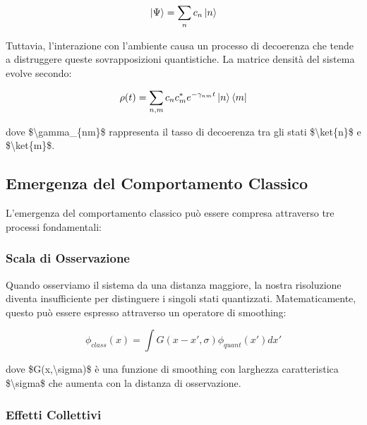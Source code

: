 \documentclass[a4paper,11pt]{article}
\begin{document}
\begin{displaymath}
\ket{\Psi} = \sum_n c_n \ket{n}
\end{displaymath}

Tuttavia, l'interazione con l'ambiente causa un processo di decoerenza
che tende a distruggere queste sovrapposizioni quantistiche. La matrice
densità del sistema evolve secondo:

\begin{displaymath}
\rho(t) = \sum_{n,m} c_n c_m^* e^{-\gamma_{nm}t} \ket{n}\bra{m}
\end{displaymath}

dove \$\textbackslash{}gamma\_\{nm\}\$ rappresenta il tasso di decoerenza tra gli stati
\$\textbackslash{}ket\{n\}\$ e \$\textbackslash{}ket\{m\}\$.

\subsection{Emergenza del Comportamento Classico}\hypertarget{emergenza-del-comportamento-classico}{}\label{emergenza-del-comportamento-classico}

L'emergenza del comportamento classico può essere compresa attraverso
tre processi fondamentali:

\subsubsection{Scala di Osservazione}\hypertarget{scala-di-osservazione}{}\label{scala-di-osservazione}

Quando osserviamo il sistema da una distanza maggiore, la nostra
risoluzione diventa insufficiente per distinguere i singoli stati
quantizzati. Matematicamente, questo può essere espresso attraverso un
operatore di smoothing:

\begin{displaymath}
\phi_{class}(x) = \int G(x-x', \sigma) \phi_{quant}(x') dx'
\end{displaymath}

dove \$G(x,\textbackslash{}sigma)\$ è una funzione di smoothing con larghezza
caratteristica \$\textbackslash{}sigma\$ che aumenta con la distanza di osservazione.

\subsubsection{Effetti Collettivi}\hypertarget{effetti-collettivi}{}\label{effetti-collettivi}
\end{document}
